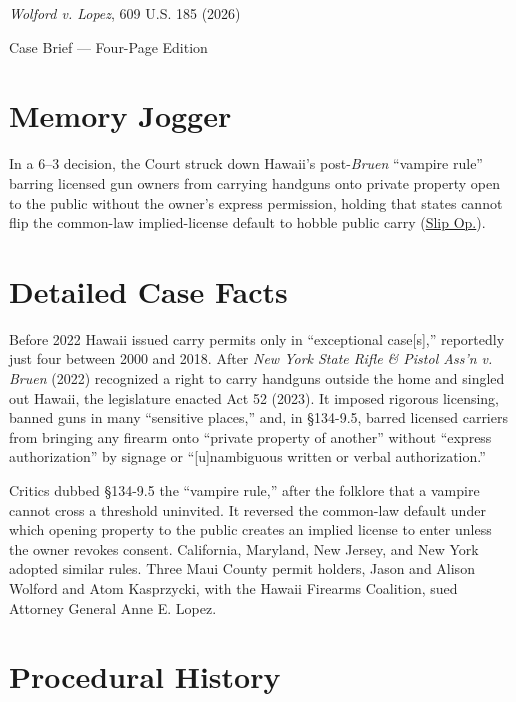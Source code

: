 \documentclass[12pt]{article}
\begin{document}
\begin{center}
{\LARGE \textit{Wolford v. Lopez}, 609 U.S. 185 (2026)\par}
\vspace{0.8em}
{\large Case Brief --- Four-Page Edition\par}
\end{center}
\vspace{1em}

\section{Memory Jogger}

In a 6--3 decision, the Court struck down Hawaii's post-\textit{Bruen} ``vampire rule'' barring licensed gun owners from carrying handguns onto private property open to the public without the owner's express permission, holding that states cannot flip the common-law implied-license default to hobble public carry (\href{https://www.supremecourt.gov/opinions/25pdf/24-1046_nmio.pdf}{Slip Op.}).

\section{Detailed Case Facts}

Before 2022 Hawaii issued carry permits only in ``exceptional case[s],'' reportedly just four between 2000 and 2018. After \textit{New York State Rifle \& Pistol Ass'n v. Bruen} (2022) recognized a right to carry handguns outside the home and singled out Hawaii, the legislature enacted Act 52 (2023). It imposed rigorous licensing, banned guns in many ``sensitive places,'' and, in \S{}134-9.5, barred licensed carriers from bringing any firearm onto ``private property of another'' without ``express authorization'' by signage or ``[u]nambiguous written or verbal authorization.''

Critics dubbed \S{}134-9.5 the ``vampire rule,'' after the folklore that a vampire cannot cross a threshold uninvited. It reversed the common-law default under which opening property to the public creates an implied license to enter unless the owner revokes consent. California, Maryland, New Jersey, and New York adopted similar rules. Three Maui County permit holders, Jason and Alison Wolford and Atom Kasprzycki, with the Hawaii Firearms Coalition, sued Attorney General Anne E. Lopez.

\section{Procedural History}
\end{document}
